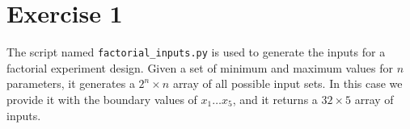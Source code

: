 \section*{Exercise 1}

The script named \texttt{factorial\_inputs.py} is used to generate the inputs for a factorial experiment design. Given a set of minimum and maximum values for $n$ parameters, it generates a $2^n \times n$ array of all possible input sets. In this case we provide it with the boundary values of $x_1 \dots x_5$, and it returns a $32 \times 5$ array of inputs.

